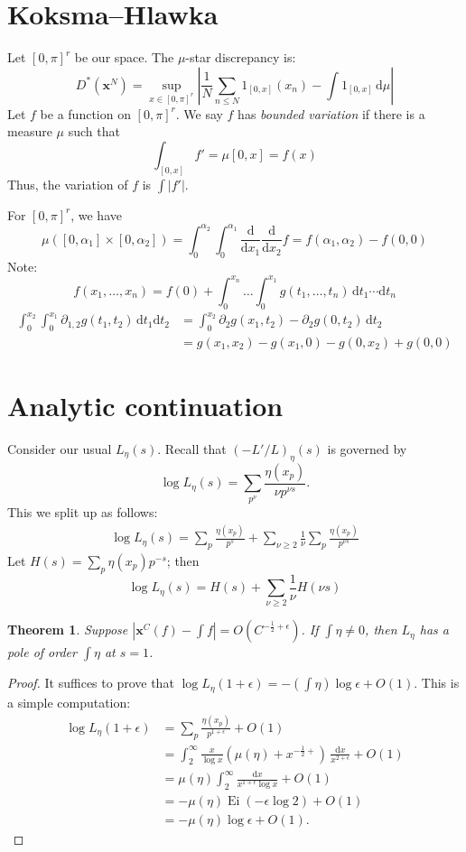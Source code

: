 \documentclass{article}
\DeclareMathOperator{\Ei}{Ei}
\newcommand{\bx}{\boldsymbol{x}}
\newcommand{\dd}{\mathrm{d}}
\newtheorem{theorem}[subsection]{Theorem}
\theoremstyle{definition}
\begin{document}
\section{Koksma--Hlawka}

Let $[0,\pi]^r$ be our space. The $\mu$-star discrepancy is:
\[
	D^\ast(\bx^N) = \sup_{x\in [0,\pi]^r} \left| \frac{1}{N} \sum_{n\leqslant N} 1_{[0,x]}(x_n) - \int 1_{[0,x]} \, \dd\mu\right|
\]
Let $f$ be a function on $[0,\pi]^r$. We say $f$ has \emph{bounded 
variation} if there is a measure $\mu$ such that 
\[
	\int_{[0,x]} f' = \mu[0,x] = f(x)
\]
Thus, the variation of $f$ is $\int |f'|$. 

For $[0,\pi]^r$, we have 
\[
	\mu([0,\alpha_1]\times [0,\alpha_2]) = \int_0^{\alpha_2} \int_0^{\alpha_1} \frac{\dd}{\dd x_1} \frac{\dd}{\dd x_2} f = f(\alpha_1,\alpha_2) - f(0,0)
\]
Note:
\[
	f(x_1,\dots,x_n) = f(0) + \int_0^{x_n} \dots \int_0^{x_1} g(t_1,\dots,t_n)\,  \dd t_1\dotsm \dd t_n
\]
\begin{align*}
	\int_0^{x_2} \int_0^{x_1} \partial_{1,2} g(t_1,t_2)\,  \dd t_1\dd t_2 
		&= \int_0^{x_2} \partial_2g(x_1,t_2) - \partial_2 g(0,t_2)\, \dd t_2 \\
		&= g(x_1,x_2) - g(x_1,0) - g(0,x_2) + g(0,0)
\end{align*}





\section{Analytic continuation}

Consider our usual $L_\eta(s)$. Recall that $(-L'/L)_\eta(s)$ is governed by 
\[
	\log L_\eta(s) = \sum_{p^\nu} \frac{\eta(x_p)}{\nu p^{\nu s}} .
\]
This we split up as follows:
\begin{align*}
	\log L_\eta(s) = \sum_p \frac{\eta(x_p)}{p^s} + \sum_{\nu\geqslant 2}\frac{1}{\nu} \sum_p \frac{\eta(x_p)}{p^{\nu s}}
\end{align*}
Let $H(s) = \sum_p \eta(x_p) p^{-s}$; then 
\[
	\log L_\eta(s) = H(s) + \sum_{\nu\geqslant 2} \frac{1}{\nu} H(\nu s)
\]

\begin{theorem}
Suppose $|\bx^C(f)-\int f| = O(C^{-\frac 1 2+\epsilon})$. If $\int \eta\ne 0$, 
then $L_\eta$ has a pole of order $\int\eta$ at $s=1$. 
\end{theorem}
\begin{proof}
It suffices to prove that 
$\log L_\eta(1+\epsilon) = -(\int\eta) \log\epsilon+O(1)$. This is a simple 
computation:
\begin{align*}
	\log L_\eta(1+\epsilon) 
		&= \sum_p \frac{\eta(x_p)}{p^{1+\epsilon}} + O(1) \\
		&= \int_2^\infty \frac{x}{\log x} (\mu(\eta)+x^{-\frac 1 2+})\, \frac{\dd x}{x^{2+\epsilon}} + O(1) \\
		&= \mu(\eta) \int_2^\infty \frac{\dd x}{x^{1+\epsilon}\log x} + O(1) \\
		&= -\mu(\eta) \Ei(-\epsilon \log 2) + O(1) \\
		&= -\mu(\eta) \log \epsilon + O(1) .
\end{align*}
\end{proof}
\end{document}
